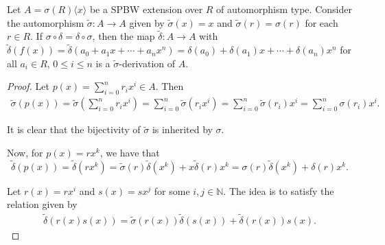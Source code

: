 \documentclass[10pt,a4paper]{amsart}
\begin{document}
\begin{proposition}\label{extaautoSPBW1}
Let $A = \sigma(R)\langle x \rangle$ be a SPBW extension over $R$ of automorphism type. Consider the automorphism $\widetilde{\sigma}:A \rightarrow A$ given by $\widetilde{\sigma}(x) = x$ and $\widetilde{\sigma}(r)=\sigma(r)$ for each $r\in R$. If  $\sigma \circ \delta = \delta \circ \sigma$, then the map $\widetilde{\delta}:A\rightarrow A$ with $\widetilde{\delta}(f(x))=\widetilde{\delta}(a_0+a_1x+ \cdots +a_nx^n)=\delta(a_0)+\delta(a_1)x+ \cdots + \delta(a_n)x^n$ for all $a_i \in R$, $0\leq i\leq n$ is a $\widetilde{\sigma}$-derivation of $A$.
\end{proposition}

\begin{proof}
    Let $p(x) = \sum\limits_{i=0}^n r_i x^i \in A $. Then
    \begin{align*}
        \widetilde{\sigma}(p(x)) = \widetilde{\sigma} \left(\sum_{i=0}^n r_i x^i\right) = \sum_{i=0}^n \widetilde{\sigma}(r_i x^i) = \sum_{i=0}^n\widetilde{\sigma} (r_i) x^i = \sum_{i=0}^n\sigma(r_i) x^i.
    \end{align*}
    
It is clear that the bijectivity of $\widetilde{\sigma}$ is inherited by $\sigma$.

Now, for $p(x) = r x^k$, we have that
\begin{equation*}
    \widetilde{\delta} (p(x)) = \widetilde{\delta}(r x^k) = \widetilde{\sigma}(r)\widetilde{\delta} (x^k) +x  \widetilde{\delta}(r) x^k = \sigma(r)\widetilde{\delta}(x^k) + \delta(r) x^k.
\end{equation*}

Let $r(x) = r x^i$ and $s(x) = s x^j$ for some $i,j \in \mathbb{N}$. The idea is to satisfy the relation given by
\begin{align*}
    \widetilde{\delta} (r(x) s(x)) = \widetilde{\sigma} (r(x)) \widetilde{\delta}(s(x)) + \widetilde{\delta} (r(x)) s(x).
\end{align*}


\end{proof}
\end{document}
